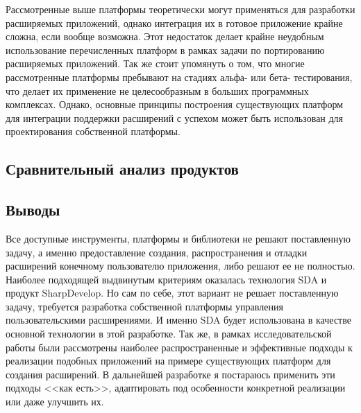 Рассмотренные выше платформы теоретически могут применяться для разработки расширяемых приложений, однако интеграция их в готовое приложение крайне сложна, если вообще возможна. Этот недостаток делает крайне неудобным использование перечисленных платформ в рамках задачи по портированию расширяемых приложений. Так же стоит упомянуть о том, что многие рассмотренные платформы пребывают на стадиях альфа- или бета- тестирования, что делает их применение не целесообразным в больших программных комплексах. Однако, основные принципы построения существующих платформ для интеграции поддержки расширений с успехом может быть использован для проектирования собственной платформы.

\subsection{Сравнительный анализ продуктов}




\subsection{Выводы}

Все доступные инструменты, платформы и библиотеки не решают поставленную задачу, а именно предоставление создания, распространения и отладки расширений конечному пользователю приложения, либо решают ее не полностью. Наиболее подходящей выдвинутым критериям оказалась технология SDA и продукт SharpDevelop.  Но сам по себе, этот вариант не решает поставленную задачу, требуется разработка собственной платформы управления пользовательскими расширениями. И именно SDA будет использована в качестве основной технологии в этой разработке. Так же, в рамках исследовательской работы были рассмотрены наиболее распространенные и эффективные подходы к реализации подобных приложений на примере существующих платформ для создания расширений. В дальнейшей разработке я постараюсь применить эти подходы <<как есть>>, адаптировать под особенности конкретной реализации или даже улучшить их.


\pagebreak
